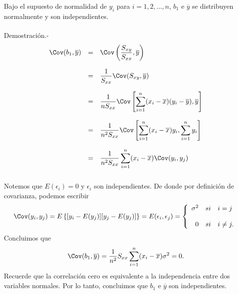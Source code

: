 \begin{teo} Bajo el supuesto de normalidad de $y_i$ para $i = 1, 2, \ldots , n$, $b_1$ e $\overline{y}$ se distribuyen normalmente y son independientes.\\\\
    Demostración.-\; 
    $$
    \begin{array}{rcl}
	\Cov(b_1,\overline{y}) &=& \Cov\left(\dfrac{S_{xy}}{S_{xx}},\overline{y}\right)\\\\
			       &=& \dfrac{1}{S_{xx}}\Cov(S_{xy},\overline{y})\\\\
			       &=& \dfrac{1}{nS_{xx}}\Cov\left[\displaystyle\sum_{i=1}^n(x_i-\overline{x})(y_i-\overline{y}),\overline{y}\right]\\\\
			       &=& \dfrac{1}{n^2S_{xx}}\Cov\left[\displaystyle\sum_{i=1}^n (x_i-\overline{x})y_i,\displaystyle\sum_{i=1}^n y_i\right]\\\\
			       &=& \dfrac{1}{n^2S_{xx}}\displaystyle\sum_{i=1}^n (x_i-\overline{x})\Cov(y_i,y_j)\\\\
    \end{array}
    $$
    Notemos que $E(\epsilon_i)=0$ y $\epsilon_i$ son independientes. De donde por definición de covarianza, podemos escribir
    $$\Cov(y_i,y_j)=E\left\{[y_i-E(y_j)][y_j-E(y_j)]\right\}=E(\epsilon_i,\epsilon_j)=
    \left\{
	\begin{array}{rcl}
	    \sigma^2 &si& i=j\\\\
	    0 &si& i\neq j.
	\end{array}
    \right.
    $$
    Concluimos que
    $$\Cov(b_1,\overline{y})=\dfrac{1}{n^2}{S_{xx}}\sum_{i=1}^n (x_i-\overline{x})\sigma^2=0.$$
    Recuerde que la correlación cero es equivalente a la independencia entre dos variables normales. Por lo tanto, concluimos que $b_1$ e $\overline{y}$ son independientes.
\end{teo}

